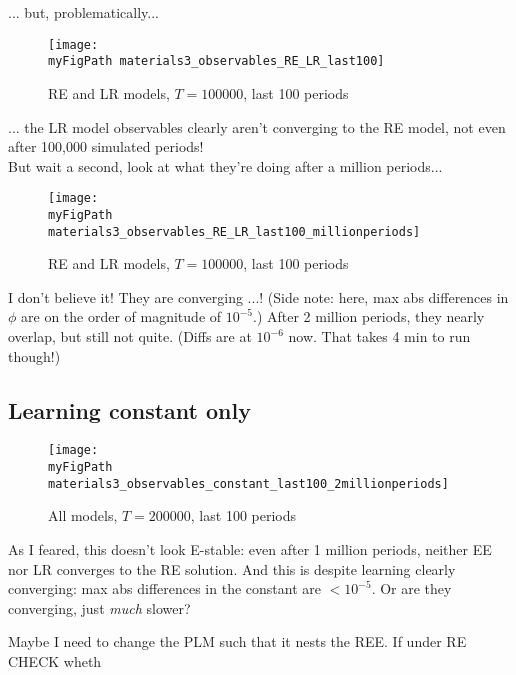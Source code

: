 \documentclass[11pt]{article}
\def \myFigPath {../figures/}
\renewcommand{\[}{\begin{equation}}
\renewcommand{\]}{\end{equation}}
\def\myFigScale{0.3}
\begin{document}
... but, problematically...

\newpage

\begin{figure}[h!]
\texttt{[image: \\myFigPath materials3\_observables\_RE\_LR\_last100]}
\caption{RE and LR models, $T = 100000$, last 100 periods}
\end{figure}

... the LR model observables clearly aren't converging to the RE model, not even after 100,000 simulated periods! \\
But wait a second, look at what they're doing after a million periods...
\begin{figure}[h!]
\texttt{[image: \\myFigPath materials3\_observables\_RE\_LR\_last100\_millionperiods]}
\caption{RE and LR models, $T = 100000$, last 100 periods}
\end{figure}

I don't believe it! They are converging ...! (Side note: here, max abs differences in $\phi$ are on the order of magnitude of $10^{-5}$.) After 2 million periods, they nearly overlap, but still not quite. (Diffs are at $10^{-6}$ now. That takes 4 min to run though!)

\newpage
\subsection{Learning constant only}

 \begin{figure}[h!]
\texttt{[image: \\myFigPath materials3\_observables\_constant\_last100\_2millionperiods]}
\caption{All models, $T = 200000$, last 100 periods}
\end{figure}
 
 As I feared, this doesn't look E-stable: even after 1 million periods, neither EE nor LR converges to the RE solution. And this is despite learning clearly converging: max abs differences in the constant are $<10^{-5}$. Or are they converging, just \emph{much} slower?
 
 Maybe I need to change the PLM such that it nests the REE. If under RE CHECK wheth
 
\end{document}
